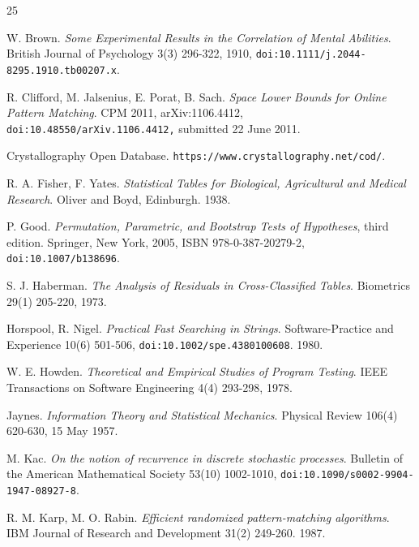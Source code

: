 \backmatter
{}
\begin{thebibliography}{25}

W. Brown. \emph{Some Experimental Results in the Correlation of Mental Abilities}. British Journal of Psychology 3(3) 296-322, 1910, \texttt{doi:10.1111/\allowbreak{}j.2044-8295.1910.tb00207.x}.

R. Clifford, M. Jalsenius, E. Porat, B. Sach. \emph{Space Lower Bounds for Online Pattern Matching}. CPM 2011, arXiv:1106.4412, \texttt{doi:10.48550/\allowbreak{}arXiv.1106.4412,} submitted 22 June 2011.

Crystallography Open Database. \texttt{https:/\allowbreak{}/\allowbreak{}www.crystallography.net/\allowbreak{}cod/\allowbreak{}}.

R. A. Fisher, F. Yates. \emph{Statistical Tables for Biological, Agricultural and Medical Research}. Oliver and Boyd, Edinburgh. 1938.

P. Good. \emph{Permutation, Parametric, and Bootstrap Tests of Hypotheses}, third edition. Springer, New York, 2005, ISBN 978-0-387-20279-2, \texttt{doi:10.1007/\allowbreak{}b138696}.

S. J. Haberman. \emph{The Analysis of Residuals in Cross-Classified Tables}. Biometrics 29(1) 205-220, 1973.

Horspool, R. Nigel. \emph{Practical Fast Searching in Strings}. Software-Practice and Experience 10(6) 501-506, \texttt{doi:10.1002/\allowbreak{}spe.4380100608}. 1980.

W. E. Howden. \emph{Theoretical and Empirical Studies of Program Testing}. IEEE Transactions on Software Engineering 4(4) 293-298, 1978.

Jaynes. \emph{Information Theory and Statistical Mechanics}. Physical Review 106(4) 620-630, 15 May 1957.

M. Kac. \emph{On the notion of recurrence in discrete stochastic processes}. Bulletin of the American Mathematical Society 53(10) 1002-1010, \texttt{doi:10.1090/\allowbreak{}s0002-9904-1947-08927-8}.

R. M. Karp, M. O. Rabin. \emph{Efficient randomized pattern-matching algorithms}. IBM Journal of Research and Development 31(2) 249-260. 1987.


\end{thebibliography}
